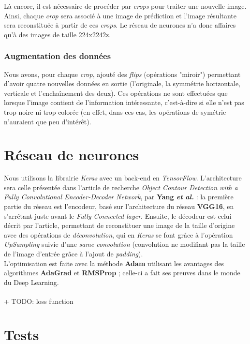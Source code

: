 \documentclass{report}
\begin{document}
Là encore, il est nécessaire de procéder par \textit{crops} pour traiter une nouvelle
image. Ainsi, chaque \textit{crop} sera associé à une image de prédiction
et l'image résultante sera reconstituée à partir de ces \textit{crops}. Le réseau
de neurones n'a donc affaires qu'à des images de taille 224x2242z.

\subsection{Augmentation des données}

Nous avons, pour chaque \textit{crop}, ajouté des \textit{flips} (opérations "miroir")
permettant d'avoir quatre nouvelles données en sortie (l'originale, la symmétrie horizontale,
verticale et l'enchaînement des deux). Ces opérations ne sont effectuées que lorsque
l'image contient de l'information intéressante, c'est-à-dire si elle n'est pas trop
noire ni trop colorée (en effet, dans ces cas, les opérations de symétrie n'auraient
que peu d'intérêt).


\chapter{Réseau de neurones}

Nous utilisons la librairie \textit{Keras} avec un back-end en \textit{TensorFlow}. L'architecture sera celle présentée dans l'article de recherche \textit{Object Contour
Detection with a Fully Convolutional Encoder-Decoder Network}, par \textbf{Yang
\textit{et al.}} : la première partie du réseau est l'encodeur, basé sur l'architecture du réseau \textbf{VGG16}, en s'arrêtant juste avant le \textit{Fully Connected layer}.
Ensuite, le décodeur est celui décrit par l'article, permettant de reconstituer
une image de la taille d'origine avec des opérations de \textit{déconvolution},
qui en \textit{Keras} se font grâce à l'opération \textit{UpSampling} suivie d'une
\textit{same convolution} (convolution ne modifiant pas la taille de l'image d'entrée
grâce à l'ajout de \textit{padding}). \\
L'optimisation est faite avec la méthode \textbf{Adam} utilisant les avantages des
algorithmes \textbf{AdaGrad} et \textbf{RMSProp}  ; celle-ci a fait ses preuves
dans le monde du Deep Learning. \\ \\
+ TODO: loss function

\chapter{Tests}
\end{document}
